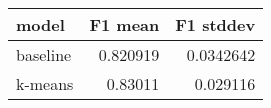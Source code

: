 \begin{tabular}{lrr}
\toprule
 model    &   F1 mean &   F1 stddev \\
\midrule
 baseline &  0.820919 &   0.0342642 \\
 k-means  &  0.83011  &   0.029116  \\
\bottomrule
\end{tabular}